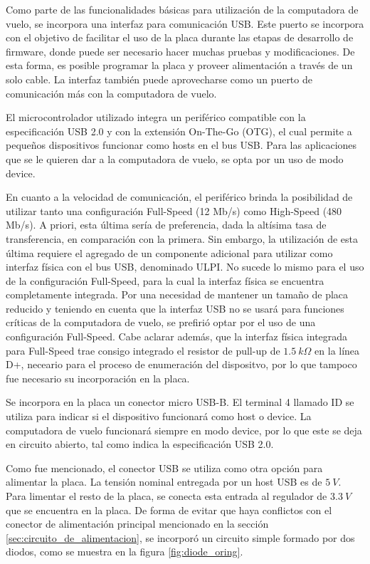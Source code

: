 Como parte de las funcionalidades básicas para utilización de la computadora de vuelo, se incorpora una interfaz para comunicación USB. Este puerto se incorpora con el objetivo de facilitar el uso de la placa durante las etapas de desarrollo de firmware, donde puede ser necesario hacer muchas pruebas y modificaciones. De esta forma, es posible programar la placa y proveer alimentación a través de un solo cable. La interfaz también puede aprovecharse como un puerto de comunicación más con la computadora de vuelo.

El microcontrolador utilizado integra un periférico compatible con la especificación USB 2.0 y con la extensión On-The-Go (OTG), el cual permite a pequeños dispositivos funcionar como hosts en el bus USB. Para las aplicaciones que se le quieren dar a la computadora de vuelo, se opta por un uso de modo device. 

En cuanto a la velocidad de comunicación, el periférico brinda la posibilidad de utilizar tanto una configuración Full-Speed (12 Mb/s) como High-Speed (480 Mb/s). A priori, esta última sería de preferencia, dada la altísima tasa de transferencia, en comparación con la primera. Sin embargo, la utilización de esta última requiere el agregado de un componente adicional para utilizar como interfaz física con el bus USB, denominado ULPI. No sucede lo mismo para el uso de la configuración Full-Speed, para la cual la interfaz física se encuentra completamente integrada. Por una necesidad de mantener un tamaño de placa reducido y teniendo en cuenta que la interfaz USB no se usará para funciones críticas de la computadora de vuelo, se prefirió optar por el uso de una configuración Full-Speed. Cabe aclarar además, que la interfaz física integrada para Full-Speed trae consigo integrado el resistor de pull-up de $1.5 \ k\Omega$ en la línea D+, neceario para el proceso de enumeración del dispositvo, por lo que tampoco fue necesario su incorporación en la placa.

Se incorpora en la placa un conector micro USB-B. El terminal 4 llamado ID se utiliza para indicar si el dispositivo funcionará como host o device. La computadora de vuelo funcionará siempre en modo device, por lo que este se deja en circuito abierto, tal como indica la especificación USB 2.0.


Como fue mencionado, el conector USB se utiliza como otra opción para alimentar la placa. La tensión nominal entregada por un host USB es de $5 \ V$. Para limentar el resto de la placa, se conecta esta entrada al regulador de $3.3 \ V$ que se encuentra en la placa. De forma de evitar que haya conflictos con el conector de alimentación principal mencionado en la sección \ref{sec:circuito_de_alimentacion}, se incorporó un circuito simple formado por dos diodos, como se muestra en la figura \ref{fig:diode_oring}.

